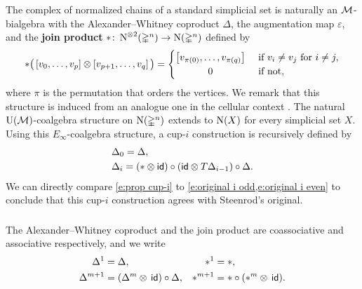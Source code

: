 The complex of normalized chains of a standard simplicial set is naturally an $\operatorname{\mathcal{M}}$-bialgebra with the Alexander--Whitney coproduct $\Delta$, the augmentation map $\varepsilon$, and the \textbf{join product} $\ast \colon \operatorname{N}^{\otimes 2}(\mathbb{\Delta}^n) \to \operatorname{N}(\mathbb{\Delta}^n)$ defined by
\[
\ast \big(\left[v_0, \dots, v_p \right] \ot \left[v_{p+1}, \dots, v_q\right]\big) =
\begin{cases} \left[v_{\pi(0)}, \dots, v_{\pi(q)}\right] & \text{ if } v_i \neq v_j \text{ for } i \neq j, \\
\hfil 0 & \text{ if not}, \end{cases}
\]
where $\pi$ is the permutation that orders the vertices.
We remark that this structure is induced from an analogue one in the cellular context \cite{medina2021prop2}.
The natural $\operatorname{U}(\operatorname{\mathcal{M}})$-coalgebra structure on $\operatorname{N}(\mathbb{\Delta}^n)$ extends to $\operatorname{N}(X)$ for every simplicial set $X$.
Using this $E_\infty$-coalgebra structure, a \mbox{cup-$i$} construction is recursively defined by
\begin{equation} \label{e:prop cup-i}
\begin{split}
& \Delta_0 = \Delta, \\
& \Delta_i =
(\ast \otimes \mathsf{id}) \circ (\mathsf{id} \otimes T \Delta_{i-1}) \circ \Delta.
\end{split}
\end{equation}
We can directly compare \cref{e:prop cup-i} to \cref{e:original i odd,e:original i even} to conclude that this \mbox{cup-$i$} construction agrees with Steenrod's original.

\subsubsection{}

The Alexander--Whitney coproduct and the join product are coassociative and associative respectively, and we write
\begin{align*}
\Delta^1 &= \Delta, &
\ast^1 &= \ast, \\
\Delta^{m+1} &= (\Delta^m \otimes \, \mathsf{id}) \circ \Delta, &
\ast^{m+1} &= \ast \circ (\ast^m \otimes \, \mathsf{id}).
\end{align*}

